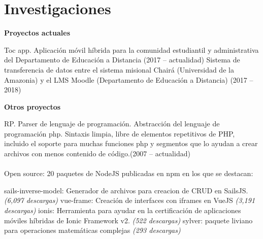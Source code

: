 \documentclass[letterpaper]{article}
\renewenvironment{itemize}{
  \begin{list}{}{
    \setlength{\leftmargin}{1.5em}
  }
}{
  \end{list}
}
\begin{document}
\section*{Investigaciones}
\begin{itemize}
	\item {\bf Proyectos actuales}
	
	\leftskip 0.5in
	\parindent -0.5in
	\subitem Toc app. Aplicaci\'on m\'ovil h\'ibrida para la comunidad estudiantil y administrativa del Departamento de Educaci\'on a Distancia (2017 -- actualidad)
	\subitem Sistema de transferencia de datos entre el sistema misional Chair\'a (Universidad de la Amazonia) y el LMS Moodle (Departamento de Educaci\'on a Distancia) (2017 -- 2018)
	
	
	\leftskip 0in
	\item {\bf Otros proyectos}
	
	\leftskip 0.5in
	\parindent -0.5in
	\subitem RP. Parser de lenguaje de programaci\'on. Abstracci\'on del lenguaje de programaci\'on php. Sintaxis limpia, libre de elementos repetitivos de PHP, incluido el soporte para muchas funciones php y segmentos que lo ayudan a crear archivos con menos contenido de c\'odigo.(2007 -- actualidad)
	\\ \\
	\subitem Open source: 20 paquetes de NodeJS publicadas en npm en los que se destacan:

	\leftskip 1in
	\parindent -0.5in
	\subitem sails-inverse-model: Generador de archivos para creacion de CRUD en SailsJS. \textit{(6,097 descargas)}
	\subitem vue-frame: Creaci\'on de interfaces con iframes en VueJS \textit{(3,191 descargas)}
	\subitem ionis: Herramienta para ayudar en la certificación de aplicaciones m\'oviles h\'ibridas de Ionic Framework v2. \textit{(522 descargas)}
	\subitem sylver: paquete liviano para operaciones matem\'aticas complejas \textit{(293 descargas)}
\end{itemize}
\end{document}
